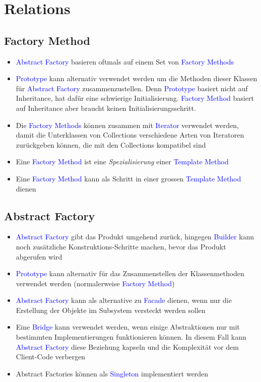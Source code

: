 \section{Relations}

\subsection{Factory Method}

\begin{itemize}
    \item \textcolor{blue}{Abstract Factory} basieren oftmals auf einem Set von \textcolor{blue}{Factory Methods}
    \item \textcolor{blue}{Prototype} kann alternativ verwendet werden um die Methoden dieser Klassen für \textcolor{blue}{Abstract Factory} zusammenzustellen. Denn \textcolor{blue}{Prototype} basiert nicht auf Inheritance, hat dafür eine schwierige Initialisierung. \textcolor{blue}{Factory Method} basiert auf Inheritance aber braucht keinen Initialisierungsschritt.
    \item Die \textcolor{blue}{Factory Methods} können zusammen mit \textcolor{blue}{Iterator} verwendet werden, damit die Unterklassen von Collections verschiedene Arten von Iteratoren zurückgeben können, die mit den Collections kompatibel sind
    \item Eine \textcolor{blue}{Factory Method} ist eine \textit{Spezialisierung} einer \textcolor{blue}{Template Method}
    \item Eine \textcolor{blue}{Factory Method} kann als Schritt in einer grossen \textcolor{blue}{Template Method} dienen
\end{itemize}

\subsection{Abstract Factory}

\begin{itemize}
    \item \textcolor{blue}{Abstract Factory} gibt das Produkt umgehend zurück, hingegen \textcolor{blue}{Builder} kann noch zusätzliche Konstruktions-Schritte machen, bevor das Produkt abgerufen wird
    \item \textcolor{blue}{Prototype} kann alternativ für das Zusammenstellen der Klassenmethoden verwendet werden (normalerweise \textcolor{blue}{Factory Method})
    \item \textcolor{blue}{Abstract Factory} kann als alternative zu \textcolor{blue}{Facade} dienen, wenn nur die Erstellung der Objekte im Subsystem versteckt werden sollen
    \item Eine \textcolor{blue}{Bridge} kann verwendet werden, wenn einige Abstraktionen nur mit bestimmten Implementierungen funktionieren können. In diesem Fall kann \textcolor{blue}{Abstract Factory} diese Beziehung
    kapseln und die Komplexität vor dem Client-Code verbergen
    \item Abstract Factories können als \textcolor{blue}{Singleton} implementiert werden
\end{itemize}

